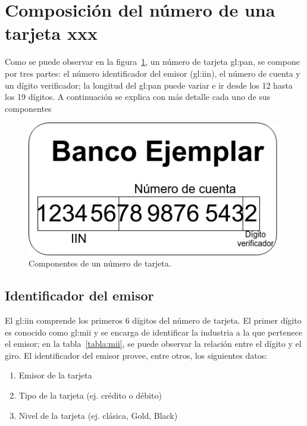 %
%

\section{Composición del número de una tarjeta xxx}
Como se puede observar en la figura~\ref{figura:pan}, un número de tarjeta
\gls{gl:pan}, se compone por tres partes: el número identificador del emisor
(\gls{gl:iin}), el número de cuenta y un dígito verificador; la longitud del
\gls{gl:pan} puede variar e ir desde los 12 hasta los 19 dígitos. A
continuación se explica con más detalle cada uno de sus componentes

\begin{figure}[H]
  \begin{center}
    \includegraphics[width=0.4\linewidth]{diagramas/tarjeta}
    \caption{Componentes de un número de tarjeta.}\label{figura:pan}
   \end{center}
\end{figure}

\subsection{Identificador del emisor}
El \gls{gl:iin} comprende los primeros 6 dígitos del número de
tarjeta. El primer dígito es conocido como \gls{gl:mii} y se encarga de
identificar la industria a la que pertenece el emisor; en la
tabla~\ref{tabla:mii}, se puede observar la relación entre el dígito y el giro.
El identificador del emisor provee, entre otros, los siguientes datos:
\begin{enumerate}
    \item Emisor de la tarjeta
    \item Tipo de la tarjeta (ej. crédito o débito)
    \item Nivel de la tarjeta (ej. clásica, Gold, Black)
\end{enumerate}

